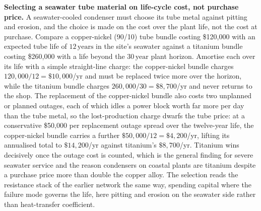\textbf{Selecting a seawater tube material on life-cycle cost, not purchase price.} A
seawater-cooled condenser must choose its tube metal against pitting and erosion, and
the choice is made on the cost over the plant life, not the cost at purchase. Compare
a copper-nickel (90/10) tube bundle costing \$120{,}000 with an expected tube life of
$12\,\text{years}$ in the site's seawater against a titanium bundle costing
\$260{,}000 with a life beyond the $30\,\text{year}$ plant horizon. Amortise each over
its life with a simple straight-line charge: the copper-nickel bundle charges
$120{,}000/12 = \$10{,}000$/yr and must be replaced twice more over the horizon, while
the titanium bundle charges $260{,}000/30 = \$8{,}700$/yr and never returns to the
shop. The replacement of the copper-nickel bundle also costs two unplanned or planned
outages, each of which idles a power block worth far more per day than the tube metal,
so the lost-production charge dwarfs the tube price: at a conservative
\$50{,}000 per replacement outage spread over the twelve-year life, the copper-nickel
bundle carries a further $\$50{,}000/12 = \$4{,}200$/yr, lifting its annualised total
to $\$14{,}200$/yr against titanium's $\$8{,}700$/yr. Titanium wins decisively once
the outage cost is counted, which is the general finding for severe seawater service
and the reason condensers on coastal plants are titanium despite a purchase price more
than double the copper alloy. The selection reads the resistance stack of the earlier
network the same way, spending capital where the failure mode governs the life, here
pitting and erosion on the seawater side rather than heat-transfer coefficient.

